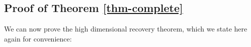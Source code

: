 


\subsection{Proof of Theorem \ref{thm-complete}} \label{sec-proof-random-theorem}

We can now prove the high dimensional recovery theorem, which we state here again for convenience:

\addtocounter{theorem}{-3}

